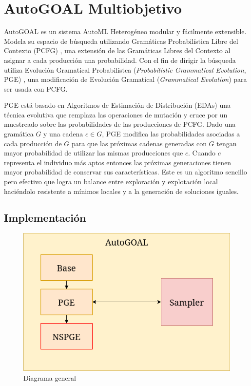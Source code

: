 \chapter{AutoGOAL Multiobjetivo}\label{chapter:implementation}
AutoGOAL  es un sistema AutoML Heterog\'eneo modular y f\'acilmente extensible. Modela su espacio de b\'usqueda utilizando Gram\'aticas Probabil\'istica  Libre del Contexto (PCFG) , una extensi\'on de las Gram\'aticas Libres del Contexto al asignar a cada producci\'on una probabilidad. Con el fin de dirigir la b\'usqueda utiliza Evoluci\'on Gramatical Probabil\'istca (\textit{Probabilistic Grammatical Evolution}, PGE) , una modificaci\'on de Evoluci\'on Gramatical (\textit{Grammatical Evolution}) 
para ser usada con PCFG.

PGE est\'a basado en Algoritmos de Estimaci\'on de Distribuci\'on (EDAs)  una t\'ecnica evolutiva que remplaza las operaciones de mutaci\'on y cruce por un muestreado sobre las probabilidades de las producciones de PCFG. Dado una gram\'atica $G$ y una cadena $c \in G$, PGE modifica las probabilidades asociadas a cada producci\'on de $G$ para que las pr\'oximas cadenas generadas con $G$ tengan mayor probabilidad de utilizar las mismas producciones que $c$. Cuando $c$ representa el individuo m\'as aptos entonces las pr\'oximas generaciones tienen mayor probabilidad de conservar sus caracter\'isticas.
Este es un algoritmo sencillo pero efectivo que logra un balance entre exploraci\'on y explotaci\'on local haci\'endolo resistente a m\'inimos locales y a la generaci\'on de soluciones iguales.

\section{Implementaci\'on}

\begin{figure}[ht]
    \centering
    \includegraphics[scale=0.6]{Pictures/autogoal_impl.png}
    \caption{Diagrama general}
    \label{impl:fig:general_diagram}
\end{figure}


